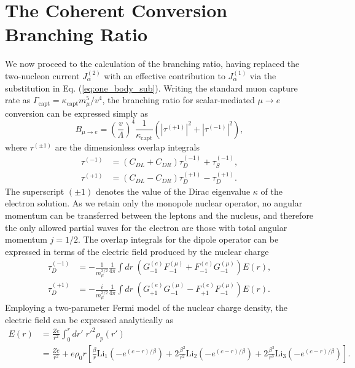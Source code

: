 \documentclass{book}[letterpaper,12pt]
\begin{document}
\section{The Coherent Conversion Branching Ratio}
We now proceed to the calculation of the branching ratio, having replaced the two-nucleon current $J_\alpha^{(2)}$ with an effective contribution to $J_\alpha^{(1)}$ via the substitution in Eq. (\ref{eq:one_body_sub}).  Writing the standard muon capture rate as $\Gamma_\mathrm{capt}=\kappa_\mathrm{capt}m_{\mu}^5/v^4$, the branching ratio for scalar-mediated $\mu\rightarrow e$ conversion can be expressed simply as 
\begin{equation}
B_{\mu\rightarrow e}=\left(\frac{v}{\Lambda}\right)^4\frac{1}{\kappa_\mathrm{capt}}\left(\left|\tau^{(+1)}\right|^2+\left|\tau^{(-1)}\right|^2\right),
\label{eq:coherent_mu2e_BR}
\end{equation}
where $\tau^{(\pm 1)}$ are the dimensionless overlap integrals
\begin{equation}
\begin{split}
\tau^{(-1)}&=\left(C_{DL}+C_{DR}\right)\tau^{(-1)}_D+\tau_S^{(-1)},\\
\tau^{(+1)}&=\left(C_{DL}-C_{DR}\right)\tau_D^{(+1)}-\tau_D^{(+1)}.
\end{split}
\end{equation}
The superscript $(\pm 1)$ denotes the value of the Dirac eigenvalue $\kappa$ of the electron solution. As we retain only the monopole nuclear operator, no angular momentum can be transferred between the leptons and the nucleus, and therefore the only allowed partial waves for the electron are those with total angular momentum $j=1/2$. The overlap integrals for the dipole operator can be expressed in terms of the electric field produced by the nuclear charge
\begin{equation}
\begin{split}
\tau_D^{(-1)}&=-\frac{1}{m_{\mu}^{3/2}}\frac{1}{4\pi}\int dr\;\left(G_{-1}^{(e)}F_{-1}^{(\mu)}+F_{-1}^{(e)}G_{-1}^{(\mu)}\right)E(r),\\
\tau_D^{(+1)}&=-\frac{i}{m_{\mu}^{3/2}}\frac{1}{4\pi}\int dr\;\left(G_{+1}^{(e)}G_{-1}^{(\mu)}-F_{+1}^{(e)}F_{-1}^{(\mu)}\right)E(r).
\end{split}
\end{equation}
Employing a two-parameter Fermi model of the nuclear charge density, the electric field can be expressed analytically as
\begin{equation}
\begin{split}
E(r)&=\frac{Ze}{r^2}\int_0^rdr'\;r'^2\rho_p(r')\\
&=\frac{Ze}{r^2}+e\rho_0r\left[\frac{\beta}{r}\mathrm{Li}_1\left(-e^{(c-r)/\beta}\right)+2\frac{\beta^2}{r^2}\mathrm{Li}_2\left(-e^{(c-r)/\beta}\right)+2\frac{\beta^3}{r^3}\mathrm{Li}_3\left(-e^{(c-r)/\beta}\right)\right].
\end{split}
\end{equation}
\end{document}
